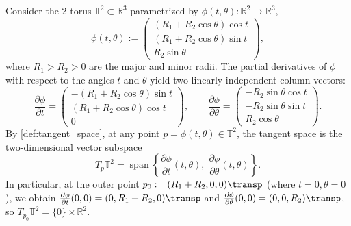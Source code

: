 \begin{example}
\label{ex:torus_tangent_space}
Consider the 2-torus $\mathbb{T}^2 \subset \mathbb{R}^3$ parametrized by $\phi(t,\theta) : \mathbb{R}^2 \to \mathbb{R}^3$,
\[
\phi(t,\theta) := \begin{pmatrix} (R_1 + R_2 \cos\theta)\cos t \\ (R_1 + R_2 \cos\theta)\sin t \\ R_2 \sin\theta \end{pmatrix},
\]
where $R_1 > R_2 > 0$ are the major and minor radii. The partial derivatives of $\phi$ with respect to the angles $t$ and $\theta$ yield two linearly independent column vectors:
\[
\frac{\partial \phi}{\partial t} = \begin{pmatrix} -(R_1 + R_2\cos\theta)\sin t \\ (R_1 + R_2\cos\theta)\cos t \\ 0 \end{pmatrix}, \qquad
\frac{\partial \phi}{\partial \theta} = \begin{pmatrix} -R_2\sin\theta\cos t \\ -R_2\sin\theta\sin t \\ R_2\cos\theta \end{pmatrix}.
\]
By \cref{def:tangent_space}, at any point $p = \phi(t,\theta) \in \mathbb{T}^2$, the tangent space is the two-dimensional vector subspace
\[
T_p \mathbb{T}^2 = \operatorname{span}\left\{ \frac{\partial \phi}{\partial t}(t,\theta), \; \frac{\partial \phi}{\partial \theta}(t,\theta) \right\}.
\]
In particular, at the outer point $p_0 := (R_1+R_2, 0, 0)\transp$ (where $t = 0, \theta = 0$), we obtain $\frac{\partial \phi}{\partial t}(0,0) = (0, R_1+R_2, 0)\transp$ and $\frac{\partial \phi}{\partial \theta}(0,0) = (0, 0, R_2)\transp$, so $T_{p_0}\mathbb{T}^2 = \{0\} \times \mathbb{R}^2$.
\end{example}

